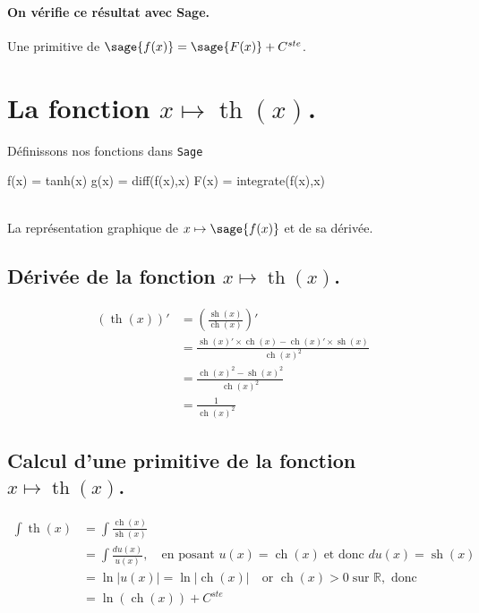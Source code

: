 \documentclass[a4paper,12pt]{report}
\def\eclaire{\mathbb}
\def\R{\ensuremath{\eclaire R}}
\renewcommand{\sinh}{\mathop{\mathrm{sh}}}
\renewcommand{\cosh}{\mathop{\mathrm{ch}}}
\renewcommand{\tanh}{\mathop{\mathrm{th}}}
\begin{document}
\paragraph{On vérifie ce résultat avec Sage.}
Une primitive de $\sage{f(x)} = \sage{F(x)} + C^{ste}$.


\section{La fonction  $x \mapsto \tanh(x)$.}

Définissons nos fonctions dans {\texttt{Sage}}
\begin{sageblock}
    f(x) = tanh(x)
    g(x) = diff(f(x),x)
    F(x) = integrate(f(x),x)
\end{sageblock}


\begin{center}
 \\
La représentation graphique de $x \mapsto \sage{f(x)} $ et de sa dérivée.
\end{center}

\subsection{Dérivée de la fonction $x \mapsto \tanh(x)$.}
\begin{align*}
(\tanh(x))' & =  \left(\frac{\sinh(x)}{\cosh(x)}\right)' \\
&  =  \frac{\sinh(x)' \times \cosh(x) - \cosh(x)' \times \sinh(x)}{\cosh(x)^2} \\ 
&  =   \frac{\cosh(x)^2 -\sinh(x)^2}{\cosh(x)^2} \\
&  =  \frac{1}{\cosh(x)^2}
\end{align*}


\subsection{Calcul d'une primitive de la fonction  $x \mapsto \tanh(x)$.}
\begin{align*}
\int \tanh(x) & = \int \frac{\cosh(x)}{\sinh(x)} \\
&  =  \int \frac{du(x)}{u(x)} , \quad \textrm{en posant } u(x) =  \cosh(x) \; \textrm{et donc } du(x) = \sinh(x) \\
&  =  \ln|u(x)| = \ln|\cosh(x)|  \quad \textrm{or } \cosh(x)>0 \; \textrm{sur } \R ,  \textrm{ donc}\\
&  =   \ln\left(\cosh(x)\right) + C^{ste} 
\end{align*}
\end{document}
